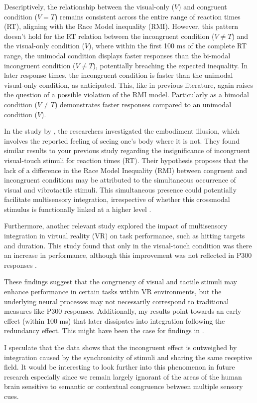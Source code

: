 \documentclass[12pt,oneside,openright]{report}
\begin{document}
Descriptively, the relationship between the visual-only ($V$) and congruent condition ($V=T$) remains consistent across the entire range of reaction times (RT), aligning with the Race Model inequality (RMI). However, this pattern doesn’t hold for the RT relation between the incongruent condition ($V \neq T$) and the visual-only condition ($V$), where within the first 100 ms of the complete RT range, the unimodal condition displays faster responses than the bi-modal incongruent condition ($V \neq T$), potentially breaching the expected inequality. In later response times, the incongruent condition is faster than the unimodal visual-only condition, as anticipated. This, like in previous literature, again raises the question of a possible violation of the RMI model. Particularly as a bimodal condition ($V \neq T$) demonstrates faster responses compared to an unimodal condition ($V$).

In the study by \cite{RSE_FBI}, the researchers investigated the embodiment illusion, which involves the reported feeling of seeing one's body where it is not. They found similar results to your previous study regarding the insignificance of incongruent visual-touch stimuli for reaction times (RT). Their hypothesis proposes that the lack of a difference in the Race Model Inequality (RMI) between congruent and incongruent conditions may be attributed to the simultaneous occurrence of visual and vibrotactile stimuli. This simultaneous presence could potentially facilitate multisensory integration, irrespective of whether this crossmodal stimulus is functionally linked at a higher level \parencite{RSE_FBI}.

Furthermore, another relevant study explored the impact of multisensory integration in virtual reality (VR) on task performance, such as hitting targets and duration. This study found that only in the visual-touch condition was there an increase in performance, although this improvement was not reflected in P300 responses \parencite{Marucci2021TheIO}. 

These findings suggest that the congruency of visual and tactile stimuli may enhance performance in certain tasks within VR environments, but the underlying neural processes may not necessarily correspond to traditional measures like P300 responses. Additionally, my results point towards an early effect (within 100 ms) that later dissipates into integration following the redundancy effect. This might have been the case for findings in \cite{RSE_FBI}.

I speculate that the data shows that the incongruent effect is outweighed by integration caused by the synchronicity of stimuli and sharing the same receptive field. It would be interesting to look further into this phenomenon in future research especially since we remain largely ignorant of the areas of the human brain sensitive to semantic or contextual congruence between multiple sensory cues. 
\end{document}
